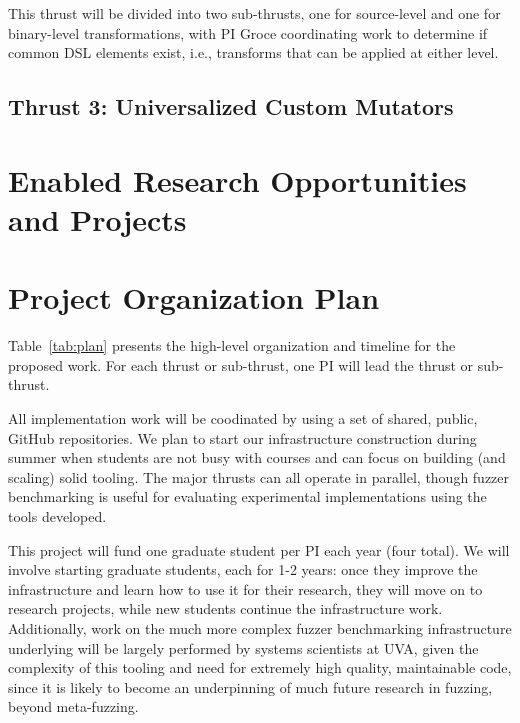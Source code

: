 \documentclass[numbers]{proposalnsf}
\begin{document}
This thrust will be divided into two sub-thrusts, one for source-level and one for binary-level transformations, with PI Groce coordinating work to determine if common DSL elements exist, i.e., transforms that can be applied at either level.

\subsection{Thrust 3: Universalized Custom Mutators}

\section{Enabled Research Opportunities and Projects}

\section{Project Organization Plan}

%
\label{sec:plan}


Table~\ref{tab:plan} presents the high-level organization and timeline for the proposed
work. For each thrust or sub-thrust, one PI will lead the thrust or sub-thrust.


All implementation work will be coodinated by using a set of shared, public, GitHub repositories.    We plan to start our
infrastructure construction during summer when students are
not busy with courses and can focus on
building (and scaling) solid tooling.  The major thrusts can all operate in parallel, though fuzzer benchmarking is useful for evaluating experimental implementations using the tools developed.


This project will fund one graduate student per PI each year
(four total).  We will
involve starting graduate students, each for 1-2 years: once they
improve the infrastructure and learn how to use it for their research,
they will move on to research projects, while new
students continue the infrastructure work.  Additionally, work on the much more complex fuzzer benchmarking infrastructure underlying will be largely performed by systems scientists at UVA, given the complexity of this tooling and need for extremely high quality, maintainable code, since it is likely to become an underpinning of much future research in fuzzing, beyond meta-fuzzing.
\end{document}

